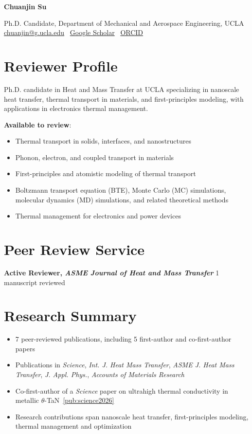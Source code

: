 \documentclass[11pt,letterpaper]{article}
\newcommand{\cvname}[1]{\begin{center}{\LARGE\bfseries #1}\end{center}}
\newcommand{\contactline}[1]{\begin{center}#1\end{center}}
\newcommand{\iconlink}[3]{\href{#1}{#3}}
\newcommand{\gap}{\par\addvspace{0.15em}}
\newcommand{\Gap}{\par\addvspace{0.35em}}
\newcommand{\cventryoneline}[2]{
  \textbf{#1} \hfill #2\par
}
\begin{document}
\cvname{Chuanjin Su}
\contactline{
  Ph.D. Candidate, Department of Mechanical and Aerospace Engineering, UCLA \\
  \iconlink{mailto:chuanjin@g.ucla.edu}{\faEnvelope}{chuanjin@g.ucla.edu}
  \textbar\ 
  \iconlink{https://scholar.google.com/citations?user=YqF4gakAAAAJ&hl=en}{\faGraduationCap}{Google Scholar}
  \textbar\ 
  \iconlink{https://orcid.org/0000-0002-0301-8068}{\faOrcid}{ORCID}
}
\Gap

\section*{Reviewer Profile}

Ph.D. candidate in Heat and Mass Transfer at UCLA specializing in nanoscale heat transfer, thermal transport in materials, and first-principles modeling, with applications in electronics thermal management.
\gap

\textbf{Available to review}:

\begin{itemize}
  \item Thermal transport in solids, interfaces, and nanostructures
  \item Phonon, electron, and coupled transport in materials
  \item First-principles and atomistic modeling of thermal transport
  \item Boltzmann transport equation (BTE), Monte Carlo (MC) simulations, molecular dynamics (MD) simulations, and related theoretical methods
  \item Thermal management for electronics and power devices
\end{itemize}
\Gap

\section*{Peer Review Service}

\cventryoneline{Active Reviewer, {\mdseries \it ASME Journal of Heat and Mass Transfer}}{1 manuscript reviewed}
\Gap

\section*{Research Summary}

\begin{itemize}
  \item 7 peer-reviewed publications, including 5 first-author and co-first-author papers
  \item Publications in \textit{Science}, \textit{Int. J. Heat Mass Transfer}, \textit{ASME J. Heat Mass Transfer}, \textit{J. Appl. Phys.}, \textit{Accounts of Materials Research}
  \item Co-first-author of a \textit{Science} paper on ultrahigh thermal conductivity in metallic $\theta$-TaN~\cref{pub:science2026}
  \item Research contributions span nanoscale heat transfer, first-principles modeling, thermal management and optimization
\end{itemize}
\Gap
\end{document}
